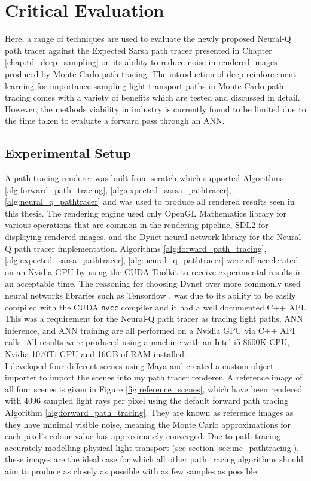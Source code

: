 \documentclass[../dissertation.tex]{subfiles}
\begin{document}
\chapter{Critical Evaluation}

\label{chap:evaluation}

Here, a range of techniques are used to evaluate the newly proposed Neural-Q path tracer against the Expected Sarsa path tracer presented in Chapter \ref{chap:td_deep_sampling} on its ability to reduce noise in rendered images produced by Monte Carlo path tracing. The introduction of deep reinforcement learning for importance sampling light transport paths in Monte Carlo path tracing comes with a variety of benefits which are tested and discussed in detail. However, the methods viability in industry is currently found to be limited due to the time taken to evaluate a forward pass through an ANN.

\section{Experimental Setup}

A path tracing renderer was built from scratch which supported Algorithms \ref{alg:forward_path_tracing}, \ref{alg:expected_sarsa_pathtracer}, \ref{alg:neural_q_pathtracer} and was used to produce all rendered results seen in this thesis. The rendering engine used only OpenGL Mathematics library \cite{glm} for various operations that are common in the rendering pipeline, SDL2 \cite{sdl2} for displaying rendered images, and the Dynet neural network library \cite{dynet} for the Neural-Q path tracer implementation. Algorithms \ref{alg:forward_path_tracing}, \ref{alg:expected_sarsa_pathtracer}, \ref{alg:neural_q_pathtracer} were all accelerated on an Nvidia GPU by using the CUDA Toolkit \cite{cuda} to receive experimental results in an acceptable time. The reasoning for choosing Dynet over more commonly used neural networks libraries such as Tensorflow \cite{tensorflow2015-whitepaper}, was due to its ability to be easily compiled with the CUDA \verb|nvcc| compiler and it had a well documented C++ API. This was a requirement for the Neural-Q path tracer as tracing light paths, ANN inference, and ANN training are all performed on a Nvidia GPU via C++ API calls. All results were produced using a machine with an Intel i5-8600K CPU, Nvidia 1070Ti GPU and 16GB of RAM installed.\\

I developed four different scenes using Maya \cite{maya} and created a custom object importer to import the scenes into my path tracer renderer. A reference image of all four scenes is given in Figure \ref{fig:reference_scenes}, which have been rendered with 4096 sampled light rays per pixel using the default forward path tracing Algorithm \ref{alg:forward_path_tracing}. They are known as reference images as they have minimal visible noise, meaning the Monte Carlo approximations for each pixel's colour value has approximately converged. Due to path tracing accurately modelling physical light transport (see section \ref{sec:mc_pathtracing}), these images are the ideal case for which all other path tracing algorithms should aim to produce as closely as possible with as few samples as possible. 
\end{document}
